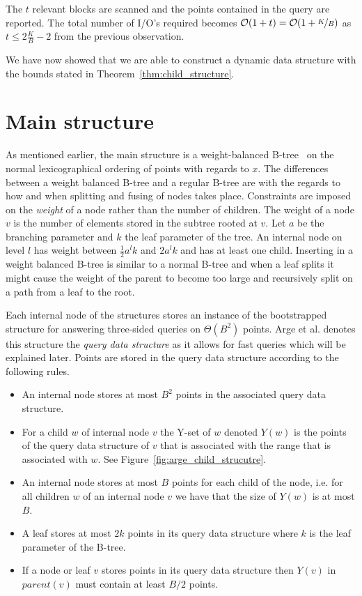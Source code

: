 \documentclass[twoside,11pt,openright]{report}
\begin{document}
The $t$ relevant blocks are scanned and the points contained in the query are reported. The total number of I/O's required becomes $\mathcal{O}(1+t) = \mathcal{O}(1+\nicefrac{K}{B})$ as $t \leq 2\frac{K}{B}-2$ from the previous observation.

We have now showed that we are able to construct a dynamic data structure with the bounds stated in Theorem~\ref{thm:child_structure}.

\section{Main structure}
\label{sec:arge_structure}
As mentioned earlier, the main structure is a weight-balanced B-tree~\cite{arge_vitter_1996} on the normal lexicographical ordering of points with regards to $x$. The differences between a weight balanced B-tree and a regular B-tree are with the regards to how and when splitting and fusing of nodes takes place. Constraints are imposed on the \textit{weight} of a node rather than the number of children. The weight of a node $v$ is the number of elements stored in the subtree rooted at $v$. Let $a$ be the branching parameter and $k$ the leaf parameter of the tree. An internal node on level $l$ has weight between $\frac{1}{2}a^lk$ and $2a^lk$ and has at least one child. Inserting in a weight balanced B-tree is similar to a normal B-tree and when a leaf splits it might cause the weight of the parent to become too large and recursively split on a path from a leaf to the root.

Each internal node of the structures stores an instance of the bootstrapped structure for answering three-sided queries on $\Theta(B^2)$ points. Arge et al. denotes this structure the \textit{query data structure} as it allows for fast queries which will be explained later. Points are stored in the query data structure according to the following rules.
\begin{itemize}
	\item{An internal node stores at most $B^2$ points in the associated query data structure.}
	\item{For a child $w$ of internal node $v$ the Y-set of $w$ denoted $Y(w)$ is the points of the query data structure of $v$ that is associated with the range that is associated with $w$. See Figure~\ref{fig:arge_child_strucutre}.}
	\item{An internal node stores at most $B$ points for each child of the node, i.e. for all children $w$ of an internal node $v$ we have that the size of $Y(w)$ is at most $B$.}
	\item{A leaf stores at most $2k$ points in its query data structure where $k$ is the leaf parameter of the B-tree.}
	\item{If a node or leaf $v$ stores points in its query data structure then $Y(v)$ in $parent(v)$ must contain at least $B/2$ points.}
\end{itemize}
\end{document}
